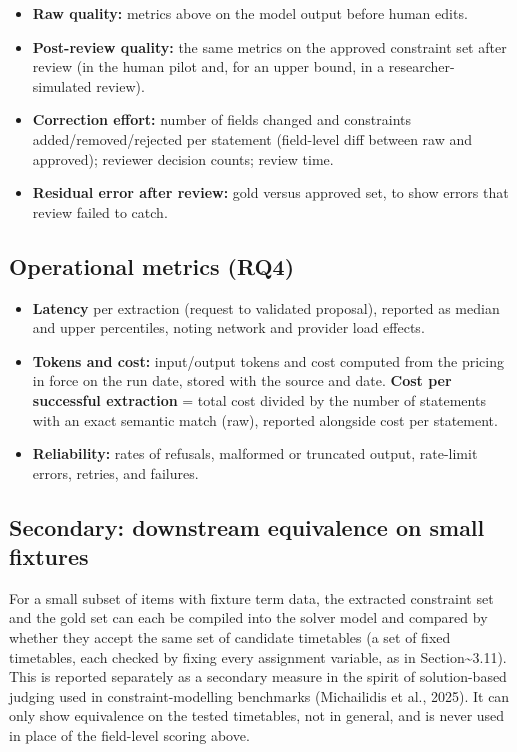 \documentclass[
  11pt,a4paper,oneside]{report}
\providecommand{\tightlist}{%
  \setlength{\itemsep}{0pt}\setlength{\parskip}{0pt}}
\begin{document}
\begin{itemize}
\tightlist
\item
  \textbf{Raw quality:} metrics above on the model output before human
  edits.
\item
  \textbf{Post-review quality:} the same metrics on the approved
  constraint set after review (in the human pilot and, for an upper
  bound, in a researcher-simulated review).
\item
  \textbf{Correction effort:} number of fields changed and constraints
  added/removed/rejected per statement (field-level diff between raw and
  approved); reviewer decision counts; review time.
\item
  \textbf{Residual error after review:} gold versus approved set, to
  show errors that review failed to catch.
\end{itemize}

\hypertarget{operational-metrics-rq4}{%
\subsection{Operational metrics (RQ4)}\label{operational-metrics-rq4}}

\begin{itemize}
\tightlist
\item
  \textbf{Latency} per extraction (request to validated proposal),
  reported as median and upper percentiles, noting network and provider
  load effects.
\item
  \textbf{Tokens and cost:} input/output tokens and cost computed from
  the pricing in force on the run date, stored with the source and date.
  \textbf{Cost per successful extraction} = total cost divided by the
  number of statements with an exact semantic match (raw), reported
  alongside cost per statement.
\item
  \textbf{Reliability:} rates of refusals, malformed or truncated
  output, rate-limit errors, retries, and failures.
\end{itemize}

\hypertarget{395a-secondary-downstream-equivalence-on-small-fixtures}{%
\subsection{Secondary: downstream equivalence on small
fixtures}\label{395a-secondary-downstream-equivalence-on-small-fixtures}}

For a small subset of items with fixture term data, the extracted
constraint set and the gold set can each be compiled into the solver
model and compared by whether they accept the same set of candidate
timetables (a set of fixed timetables, each checked by fixing every
assignment variable, as in Section\textasciitilde3.11). This is reported
separately as a secondary measure in the spirit of solution-based
judging used in constraint-modelling benchmarks (Michailidis et al.,
2025). It can only show equivalence on the tested timetables, not in
general, and is never used in place of the field-level scoring above.
\end{document}
